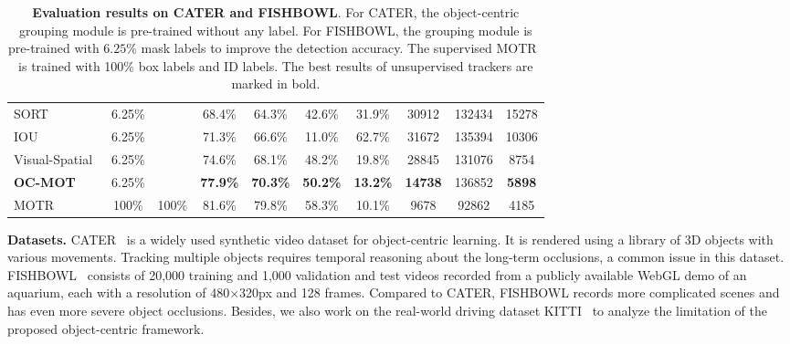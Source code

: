 \begin{table*}[!ht]
{\begin{tabular}{lccccccccc}
SORT~\cite{bewley2016simple}   &6.25\% & &68.4\% & 64.3\% & 42.6\%  & 31.9\%  & 30912 & 132434 & 15278  \\  
IOU~\cite{bochinski2017high} & 6.25\%  &  &  71.3\% &  66.6\%  & 11.0\%  & 62.7\%  &31672   &  135394 & 10306   \\
Visual-Spatial~\cite{bastani2021self}  &6.25\%   & &74.6\%    &  68.1\%      &  48.2\%       & 19.8\%   & 28845 & 131076 & 8754    \\
\textbf{OC-MOT} &6.25\%   & &  \textbf{77.9\%} & \textbf{70.3\%} &    \textbf{50.2\%}  &  \textbf{ 13.2\%}  & \textbf{14738}  & 136852 & \textbf{5898}  \\\hdashline
MOTR~\cite{zeng2022motr}   & 100\%   &  100\%  & 81.6\% & 79.8\%   &  58.3\%      &  10.1\%  & 9678   &  92862  & 4185   \\
\bottomrule[1.5pt]
\end{tabular}
}
\vspace{+0.05in}
\caption{\textbf{Evaluation results on CATER and FISHBOWL}. For CATER,  the object-centric grouping module is pre-trained without any label. For FISHBOWL, the grouping module is pre-trained with $6.25\%$ mask labels to improve the detection accuracy. The supervised MOTR~\cite{zeng2022motr} is trained with 100\% box labels and ID labels.
The best results of unsupervised trackers are marked in bold.}
	\label{tab:results}
\end{table*}

\vspace{+2.5mm}
\noindent\textbf{Datasets.} CATER~\cite{girdhar2019cater} is a widely used synthetic video dataset for object-centric learning. It is rendered using a  library of 3D objects with various movements. Tracking multiple objects requires temporal reasoning about the long-term occlusions, a common issue in this dataset. FISHBOWL~\cite{tangemann2021unsupervised} consists of 20,000 training and 1,000 validation and test videos recorded from a publicly available WebGL demo of an aquarium, each with a resolution of 480×320px and 128 frames. Compared to CATER, FISHBOWL records more complicated scenes and has even more severe object occlusions. Besides, we also work on the real-world driving dataset KITTI~\cite{Geiger2012CVPR} to analyze the limitation of the proposed object-centric framework.


